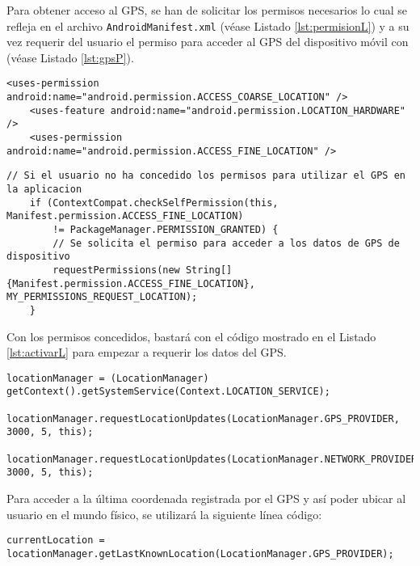 Para obtener acceso al GPS, se han de solicitar los permisos necesarios lo cual se refleja en el archivo \texttt{AndroidManifest.xml} (véase Listado \ref{lst:permisionL}) y a su vez requerir del usuario el permiso para acceder al GPS del dispositivo móvil con \ULLAR{}  (véase Listado \ref{lst:gpsP}).
 
\begin{lstlisting}[caption={Fichero \texttt{AndroidManifest.xml} del proyecto, permisos para acceder a la ubicación del dispositivo.}, label={lst:permisionL}]
    <uses-permission android:name="android.permission.ACCESS_COARSE_LOCATION" />
    <uses-feature android:name="android.permission.LOCATION_HARDWARE" />
    <uses-permission android:name="android.permission.ACCESS_FINE_LOCATION" />
\end{lstlisting}

\begin{lstlisting}[caption={Código para que el usuario conceda permiso para acceder a la ubicación del dispositivo.}, label={lst:gpsP}]
    // Si el usuario no ha concedido los permisos para utilizar el GPS en la aplicacion
    if (ContextCompat.checkSelfPermission(this, Manifest.permission.ACCESS_FINE_LOCATION)
        != PackageManager.PERMISSION_GRANTED) { 
        // Se solicita el permiso para acceder a los datos de GPS de dispositivo 
        requestPermissions(new String[]{Manifest.permission.ACCESS_FINE_LOCATION},                  MY_PERMISSIONS_REQUEST_LOCATION);  
    }
\end{lstlisting}

Con los permisos concedidos, bastará con el código mostrado en el Listado \ref{lst:activarL} para empezar a requerir los datos del GPS.



\begin{lstlisting}[caption={Código para activar el GPS del dispositivo.}, label={lst:activarL}]
    locationManager = (LocationManager) getContext().getSystemService(Context.LOCATION_SERVICE);
    locationManager.requestLocationUpdates(LocationManager.GPS_PROVIDER, 3000, 5, this);
    locationManager.requestLocationUpdates(LocationManager.NETWORK_PROVIDER, 3000, 5, this);
\end{lstlisting}

Para acceder a la última coordenada registrada por el GPS y así poder ubicar al usuario en el mundo físico, se utilizará la siguiente línea código:

\begin{lstlisting}[label={lst:ubicacionL}]
    currentLocation = locationManager.getLastKnownLocation(LocationManager.GPS_PROVIDER);
\end{lstlisting}

